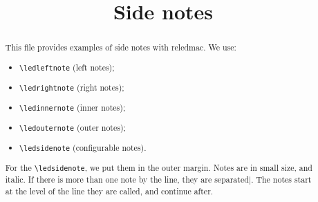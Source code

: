 \documentclass{article}
\begin{document}
\begin{english}
\date{}
\title{Side notes}
\maketitle
\begin{abstract}
This file provides examples of side notes with reledmac.
We use:
\begin{itemize}
  \item \verb+\ledleftnote+ (left notes);
  \item \verb+\ledrightnote+ (right notes);
  \item \verb+\ledinnernote+ (inner notes);
  \item \verb+\ledouternote+ (outer notes);
  \item \verb+\ledsidenote+ (configurable notes).
\end{itemize}

For the \verb+\ledsidenote+, we put them in the outer margin.
Notes are in small size, and italic. If there is more than one note by the line, they are separated$ | $. The notes start at the level of the line they are called, and continue after.
\end{abstract}
\end{english}
\end{document}
